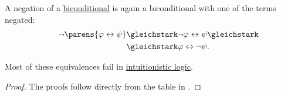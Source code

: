 \begin{proposition}
\begin{thmenum}
     A negation of a \hyperref[def:propositional_language/connectives/biconditional]{biconditional} is again a biconditional with one of the terms negated:
    \begin{equation}\label{eq:thm:boolean_equivalences/biconditional_negation}
      \begin{split}
        \mathllap{\neg \parens{\varphi \leftrightarrow \psi}}
        &\gleichstark
        \mathrlap{\neg \varphi \leftrightarrow \psi \gleichstark}
        \\ &\gleichstark
        \mathrlap{\varphi \leftrightarrow \neg \psi.}
      \end{split}
    \end{equation}
  \end{thmenum}
\end{proposition}
\begin{comments}
  \item Most of these equivalences fail in \hyperref[rem:intuitionistic_logic]{intuitionistic logic}.
\end{comments}
\begin{proof}
  The proofs follow directly from the table in .
\end{proof}

